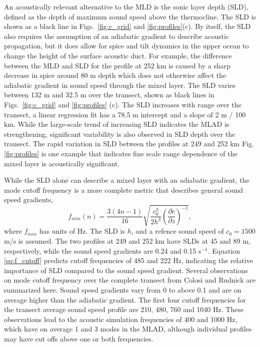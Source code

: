 \documentclass[preprint,NumberedRefs]{JASA}
\begin{document}
An acoustically relevant alternative to the MLD is the sonic layer depth (SLD), defined as the depth of maximum sound speed above the thermocline. The SLD is shown as a black line in Figs.~\ref{fig:c_grid} and \ref{fig:profiles}(c). By itself, the SLD also requires the assumption of an adiabatic gradient to describe acoustic propagation, but it does allow for spice and tilt dynamics in the upper ocean to change the height of the surface acoustic duct. For example, the difference between the MLD and SLD for the profile at 252 km is caused by a sharp decrease in spice around 80 m depth which does not otherwise affect the adiabatic gradient in sound speed through the mixed layer. The SLD varies between 132 m and 32.5 m over the transect, shown as black lines in Figs.~\ref{fig:c_grid} and \ref{fig:profiles} (c). The SLD increases with range over the transect, a linear regression fit has a 78.5 m intercept and a slope of 2 m / 100 km. While the large-scale trend of increasing SLD indicates the MLAD is strengthening, significant variability is also observed in SLD depth over the transect. The rapid variation in SLD between the profiles at 249 and 252 km Fig. \ref{fig:profiles} is one example that indicates fine scale range dependence of the mixed layer is acoustically significant.

While the SLD alone can describe a mixed layer with an adiabatic gradient, the mode cutoff frequency\citep{Urick1982Prop} is a more complete metric that describes general sound speed gradients,
\begin{equation}
    f_{min}(n) = \frac{3(4n-1)}{16} \sqrt{\frac{c_0^3}{2h^3} \left( \frac{\partial c}{\partial z} \right) ^ {-1}},
    \label{eq:f_cutoff}
\end{equation}
where $f_{min}$ has units of Hz. The SLD is $h$, and a refence sound speed of $c_0 = 1500$ m/s is assumed. The two profiles at 249 and 252 km have SLDs at 45 and 89 m, respectively, while the sound speed gradients are 0.24 and 0.15 s$^{-1}$. Equation \eqref{eq:f_cutoff} predicts cutoff frequencies of 485 and 222 Hz, indicating the relative importance of SLD compared to the sound speed gradient. Several observations on mode cutoff frequency over the complete transect from Colosi and Rudnick\cite{colosi2020observations} are summarized here. Sound speed gradients vary from 0 to above 0.1 and are on average higher than the adiabatic gradient. The first four cutoff frequencies for the transect average sound speed profile are 210, 480, 760 and 1040 Hz. These observations lead to the acoustic simulation frequencies of 400 and 1000 Hz, which have on average 1 and 3 modes in the MLAD, although individual profiles may have cut offs above one or both frequencies.
\end{document}
